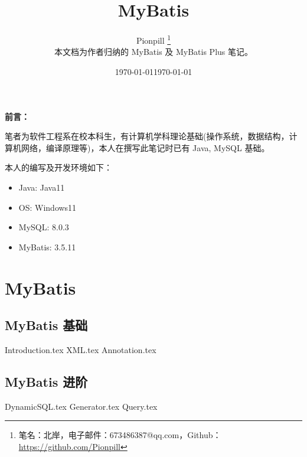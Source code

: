 \documentclass{PionpillNote-book}
\title{MyBatis}
\author{
    Pionpill \footnote{笔名：北岸，电子邮件：673486387@qq.com，Github：\url{https://github.com/Pionpill}} \\
    本文档为作者归纳的 MyBatis 及 MyBatis Plus 笔记。\\
}
\date{\today}
\begin{document}
\pagestyle{plain}
\maketitle

\noindent\textbf{前言：}

笔者为软件工程系在校本科生，有计算机学科理论基础(操作系统，数据结构，计算机网络，编译原理等)，本人在撰写此笔记时已有 Java, MySQL 基础。

本人的编写及开发环境如下：
\begin{itemize}
    \item Java: Java11
    \item OS: Windows11 
    \item MySQL: 8.0.3
    \item MyBatis: 3.5.11
\end{itemize}

\date{\today}
\newpage

\tableofcontents

\newpage

\setcounter{page}{1} 
\pagestyle{fancy}

\part{MyBatis}
\chapter{MyBatis 基础}
{Introduction.tex}
{XML.tex}
{Annotation.tex}
\chapter{MyBatis 进阶}
{DynamicSQL.tex}
{Generator.tex}
{Query.tex}
\end{document}
